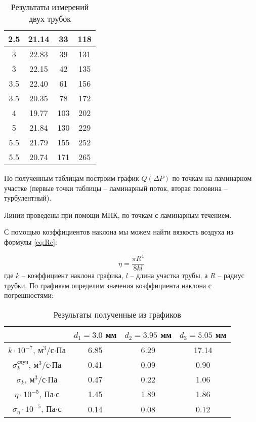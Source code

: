 \documentclass[a4paper, 12pt]{article}
\begin{document}
\begin{table}[h]
\begin{minipage}{.49\linewidth}
\begin{tabular}{|c|c|c|c|}
				2.5 & 21.14 & 33 & 118 \\ \hline
				3 & 22.83 & 39 & 131 \\ \hline \hline
				3 & 22.15 & 42 & 135 \\ \hline
				3.5 & 22.40 & 61 & 156 \\ \hline
				3.5 & 20.35 & 78 & 172 \\ \hline
				4 & 19.77 & 103 & 202 \\ \hline
				5 & 21.84 & 130 & 229 \\ \hline
				5.5 & 21.79 & 155 & 252 \\ \hline
				5.5 & 20.74 & 171 & 265 \\ \hline
			\end{tabular}
		\end{minipage}
		\egroup
		\caption{Результаты измерений двух трубок}
		\label{lowp}
	\end{table}  
    \FloatBarrier

	По полученным таблицам построим график $Q(\Delta P)$ по точкам на ламинарном участке (первые точки таблицы -- ламинарный поток, вторая половина -- турбулентный).
	

	Линии проведены при помощи МНК, по точкам с ламинарным течением.
	
	С помощью коэффициентов наклона мы можем найти вязкость воздуха из формулы \eqref{eq:Re}:
	
	\begin{equation*}
		\eta = \frac{\pi R^4}{8kl}
	\end{equation*}
	где $k$ -- коэффициент наклона графика, $l$ -- длина участка трубы, а $R$ -- радиус трубки.
	\vspace{10pt}
	По графикам определим значения коэффициента наклона с погрешностями:

	\begin{table}[h]
		\begin{center}
		\bgroup
		\def\arraystretch{1.1}%
			\begin{tabular}{|c|c|c|c|}
				\hline
				&$d_1 = 3.0$ мм&$d_2 = 3.95$ мм&$d_3 = 5.05$ мм\\ \hline
				$k\cdot10^{-7}$, $\text{м}^3$/с$\cdot$Па&6.85&6.29&17.14\\ \hline
				$\sigma_k^{\text{случ}}$, $\text{м}^3$/с$\cdot$Па&0.41&0.09&0.90\\ \hline
				$\sigma_k$, $\text{м}^3$/с$\cdot$Па&0.47& 0.22&1.06 \\ \hline
				$\eta\cdot10^{-5}$, Па$\cdot$с&1.45&1.89&1.86 \\ \hline
				$\sigma_\eta\cdot10^{-5}$, Па$\cdot$с&0.14&0.08&0.12\\ \hline
			\end{tabular}
		\egroup
		\caption{Результаты полученные из графиков}
		\label{highp}
		\end{center}
	\end{table}
	
\end{document}
